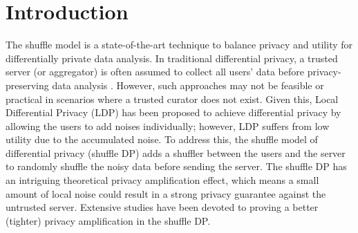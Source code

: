 \documentclass[letterpaper]{article} %
\begin{document}
\section{Introduction}
The shuffle model \cite{Bittau2017prochlo} is a state-of-the-art technique to balance privacy and utility for differentially private data analysis.
In traditional differential privacy, a trusted server (or aggregator) is often assumed to collect all users' data before privacy-preserving data analysis \cite{Dwork2014algorithmic}.
However, such approaches may not be feasible or practical in scenarios where a trusted curator does not exist.
Given this, Local Differential Privacy (LDP) \cite{KS11} has been proposed to achieve differential privacy by allowing the users to add noises individually; however, LDP suffers from low utility due to the accumulated noise. %
To address this, the shuffle model of differential privacy (shuffle DP) \cite{Bittau2017prochlo, balle2019privacy, Erlingsson2019amplification} adds a shuffler between the users and the server to randomly shuffle the noisy data before sending the server.
The shuffle DP has an intriguing theoretical privacy amplification effect, which means a small amount of local noise could result in a strong privacy guarantee against the untrusted server.
Extensive studies \cite{balle2019privacy,Erlingsson2019amplification,Girgis2021renyi,Feldman2022hiding, liu2021flame,GDDSK21federated} have been devoted to proving a better (tighter) privacy amplification in the shuffle DP.
\end{document}
